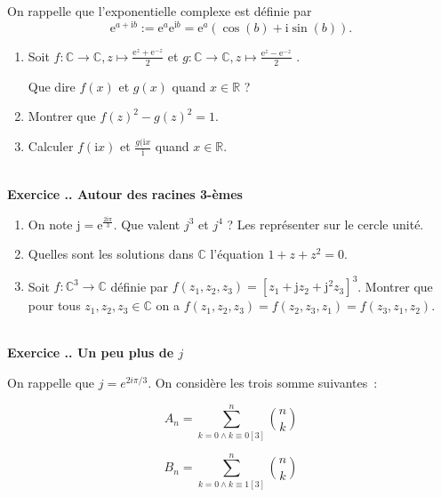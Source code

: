 \documentclass{article}
\newcommand{\mb}[1]{\mathbb{#1}}
\newcounter{exo}
\newcommand{\exercice}[1][\null]{\textbf{\\ \large Exercice \thesection.\theexo. \normalsize #1} \addtocounter{exo}{1}}
\begin{document}
On rappelle que l'exponentielle complexe est définie par $$\text{e}^{a+\text{i}b} := \text{e}^{a} \text{e}^{\text{i}b} = \text{e}^{a} (\cos(b) + \text{i} \sin(b)).$$
\begin{enumerate}


\item Soit $f: \mb{C} \rightarrow \mb{C}, z \mapsto \frac{\text{e}^{z}+\text{e}^{-z}}{2}$ et $g: \mb{C} \rightarrow \mb{C}, z \mapsto \frac{\text{e}^{z}-\text{e}^{-z}}{2}$ .

Que dire $f(x)$ et $g(x)$ quand $x \in \mb{R}$ ?

\item Montrer que $f(z)^2 - g(z)^2 = 1$.

\item Calculer $f(\text{i} x)$ et  $\frac{g(\text{i} x}{\text{i}}$ quand $x \in \mb{R}$.

\end{enumerate}





\exercice[Autour des racines 3-èmes]

\begin{enumerate}

\item On note $\text{j} = \text{e}^{\frac{2 \text{i} \pi}{3}}$. Que valent $j^3$ et $j^4$ ? Les représenter sur le cercle unité.

\item Quelles sont les solutions dans $\mb{C}$ l'équation $1 + z + z^2 = 0$.

\item Soit $f : \mb{C}^3 \rightarrow \mb{C}$ définie par $f(z_1, z_2, z_3) = \left[z_1 + \text{j} z_2 + \text{j}^2 z_3\right]^3$. Montrer que pour tous $z_1, z_2, z_3 \in \mb{C}$ on a $f(z_1, z_2, z_3) = f(z_2, z_3, z_1) = f(z_3, z_1, z_2)$.

\end{enumerate}

\exercice[Un peu plus de $j$]

On rappelle que $j = e^{2i\pi /3}$.
On considère les trois somme suivantes~:

\begin{equation*}
    A_n = \sum_{k = 0 \wedge k \equiv 0 [3]}^{n} { n \choose k} 
\end{equation*}

\begin{equation*}
    B_n = \sum_{k = 0 \wedge k \equiv 1 [3]}^{n} { n \choose k} 
\end{equation*}
\end{document}
